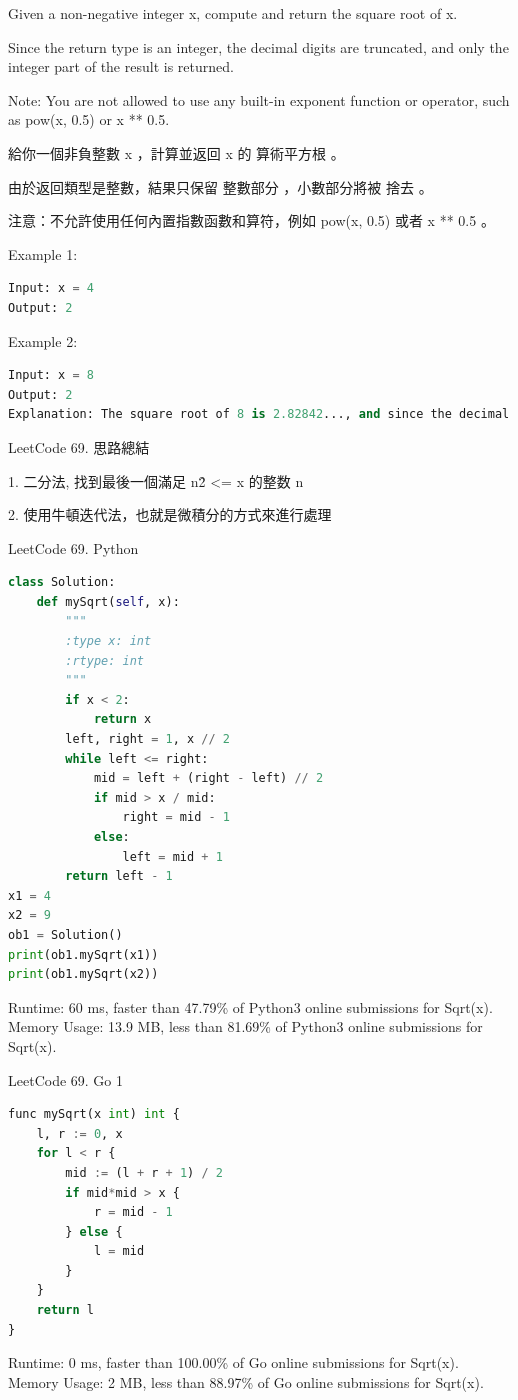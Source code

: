 \documentclass[10pt,UTF8]{ctexart}
\begin{document}
Given a non-negative integer x, compute and return the square root of x.

Since the return type is an integer, the decimal digits are truncated, and only the integer part of the result is returned.

Note: You are not allowed to use any built-in exponent function or operator, such as pow(x, 0.5) or x ** 0.5.

給你一個非負整數 x ，計算並返回 x 的 算術平方根 。

由於返回類型是整數，結果只保留 整數部分 ，小數部分將被 捨去 。

注意：不允許使用任何內置指數函數和算符，例如 pow(x, 0.5) 或者 x ** 0.5 。

Example 1:
\begin{lstlisting}[language={python}]
Input: x = 4
Output: 2
\end{lstlisting}

Example 2:
\begin{lstlisting}[language={python}]
Input: x = 8
Output: 2
Explanation: The square root of 8 is 2.82842..., and since the decimal part is truncated, 2 is returned.
\end{lstlisting}


LeetCode 69. 思路總結

1. 二分法, 找到最後一個滿足 n\^2 <= x 的整数 n

2. 使用牛頓迭代法，也就是微積分的方式來進行處理

LeetCode 69. Python

\begin{lstlisting}[language={python}]
class Solution:
    def mySqrt(self, x):
        """
        :type x: int
        :rtype: int
        """
        if x < 2:
            return x
        left, right = 1, x // 2
        while left <= right:
            mid = left + (right - left) // 2
            if mid > x / mid:
                right = mid - 1
            else:
                left = mid + 1
        return left - 1
x1 = 4
x2 = 9
ob1 = Solution()
print(ob1.mySqrt(x1))
print(ob1.mySqrt(x2))
\end{lstlisting}
Runtime: 60 ms, faster than 47.79\% of Python3 online submissions for Sqrt(x).
Memory Usage: 13.9 MB, less than 81.69\% of Python3 online submissions for Sqrt(x).


LeetCode 69. Go 1

\begin{lstlisting}[language={python}]
func mySqrt(x int) int {
    l, r := 0, x
    for l < r {
        mid := (l + r + 1) / 2
        if mid*mid > x {
            r = mid - 1
        } else {
            l = mid
        }
    }
    return l
}
\end{lstlisting}
Runtime: 0 ms, faster than 100.00\% of Go online submissions for Sqrt(x).
Memory Usage: 2 MB, less than 88.97\% of Go online submissions for Sqrt(x).
\end{document}
